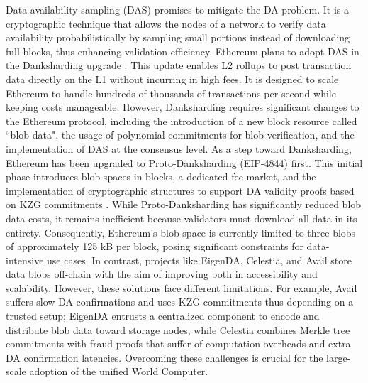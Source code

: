 \documentclass[11pt]{article}
\begin{document}
Data availability sampling (DAS) \cite{hasw:2023/1079, AlBass18} promises to mitigate the DA problem. It is a cryptographic technique that allows the nodes of a network to verify data availability probabilistically by sampling small portions instead of downloading full blocks, thus enhancing validation efficiency. Ethereum plans to adopt DAS in the Danksharding upgrade \cite{eip4844, damato2023danksharding}. This update enables L2 rollups to post transaction data directly on the L1 without incurring in high fees. It is designed to scale Ethereum to handle hundreds of thousands of transactions per second while keeping costs manageable. However, Danksharding requires significant changes to the Ethereum protocol, including the introduction of a new block resource called ``blob data", the usage of polynomial commitments for blob verification, and the implementation of DAS at the consensus level. As a step toward Danksharding, Ethereum has been upgraded to Proto-Danksharding (EIP-4844) \cite{eip4844} first. This initial phase introduces blob spaces in blocks, a dedicated fee market, and the implementation of cryptographic structures to support DA validity proofs based on KZG commitments \cite{kzg-2010-23846}. While Proto-Danksharding has significantly reduced blob data costs, it remains inefficient because validators must download all data in its entirety. Consequently, Ethereum's blob space is currently limited to three blobs of approximately 125 kB per block, posing significant constraints for data-intensive use cases.
%
In contrast, projects like EigenDA, Celestia, and Avail \cite{eigenda, celestia24, avail24} store data blobs off-chain with the aim of improving both in accessibility and scalability. However, these solutions face different limitations. For example, Avail suffers slow DA confirmations and uses KZG commitments thus depending on a trusted setup; EigenDA entrusts a centralized component to encode and distribute blob data toward storage nodes, while Celestia combines Merkle tree commitments with fraud proofs that suffer of computation overheads and extra DA confirmation latencies. Overcoming these challenges is crucial for the large-scale adoption of the unified World Computer.

\smallskip
\end{document}
